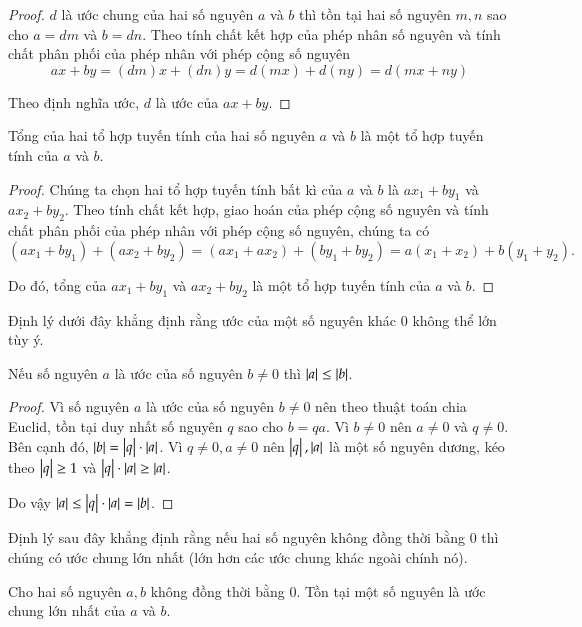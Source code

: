 \begin{proof}
    $d$ là ước chung của hai số nguyên $a$ và $b$ thì tồn tại hai số nguyên $m, n$ sao cho $a = dm$ và $b = dn$. Theo tính chất kết hợp của phép nhân số nguyên và tính chất phân phối của phép nhân với phép cộng số nguyên
    \[
        ax + by = (dm)x + (dn)y = d(mx) + d(ny) = d(mx + ny)
    \]

    Theo định nghĩa ước, $d$ là ước của $ax + by$.
\end{proof}

\begin{theorem}
    Tổng của hai tổ hợp tuyến tính của hai số nguyên $a$ và $b$ là một tổ hợp tuyến tính của $a$ và $b$.
\end{theorem}

\begin{proof}
    Chúng ta chọn hai tổ hợp tuyến tính bất kì của $a$ và $b$ là $ax_{1} + by_{1}$ và $ax_{2} + by_{2}$. Theo tính chất kết hợp, giao hoán của phép cộng số nguyên và tính chất phân phối của phép nhân với phép cộng số nguyên, chúng ta có
    \[
        (ax_{1} + by_{1}) + (ax_{2} + by_{2}) = (ax_{1} + ax_{2}) + (by_{1} + by_{2}) = a(x_{1} + x_{2}) + b(y_{1} + y_{2}).
    \]

    Do đó, tổng của $ax_{1} + by_{1}$ và $ax_{2} + by_{2}$ là một tổ hợp tuyến tính của $a$ và $b$.
\end{proof}

\noindent Định lý dưới đây khẳng định rằng ước của một số nguyên khác $0$ không thể lớn tùy ý.
\begin{theorem}\label{theorem:bound-of-divisors}
    Nếu số nguyên $a$ là ước của số nguyên $b\ne 0$ thì $\left\vert{a}\right\vert\leq \left\vert{b}\right\vert$.
\end{theorem}

\begin{proof}
    Vì số nguyên $a$ là ước của số nguyên $b\ne 0$ nên theo thuật toán chia Euclid, tồn tại duy nhất số nguyên $q$ sao cho $b = qa$. Vì $b\ne 0$ nên $a\ne 0$ và $q\ne 0$. Bên cạnh đó, $\left\vert{b}\right\vert = \left\vert{q}\right\vert\cdot\left\vert{a}\right\vert$. Vì $q\ne 0, a\ne 0$ nên $\left\vert{q}\right\vert, \left\vert{a}\right\vert$ là một số nguyên dương, kéo theo $\left\vert{q}\right\vert\geq 1$ và $\left\vert{q}\right\vert\cdot\left\vert{a}\right\vert \geq \left\vert{a}\right\vert$.

    Do vậy $\left\vert{a}\right\vert\leq \left\vert{q}\right\vert\cdot\left\vert{a}\right\vert = \left\vert{b}\right\vert$.
\end{proof}

Định lý sau đây khẳng định rằng nếu hai số nguyên không đồng thời bằng $0$ thì chúng có ước chung lớn nhất (lớn hơn các ước chung khác ngoài chính nó).
\begin{theorem}
    Cho hai số nguyên $a, b$ không đồng thời bằng $0$. Tồn tại một số nguyên là ước chung lớn nhất của $a$ và $b$.
\end{theorem}

